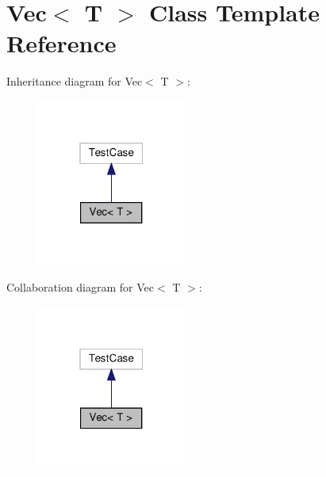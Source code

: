 \hypertarget{classVec}{}\section{Vec$<$ T $>$ Class Template Reference}
\label{classVec}


Inheritance diagram for Vec$<$ T $>$\+:
\nopagebreak
\begin{figure}[H]
\begin{center}
\leavevmode
\includegraphics[width=139pt]{classVec__inherit__graph}
\end{center}
\end{figure}


Collaboration diagram for Vec$<$ T $>$\+:
\nopagebreak
\begin{figure}[H]
\begin{center}
\leavevmode
\includegraphics[width=139pt]{classVec__coll__graph}
\end{center}
\end{figure}
